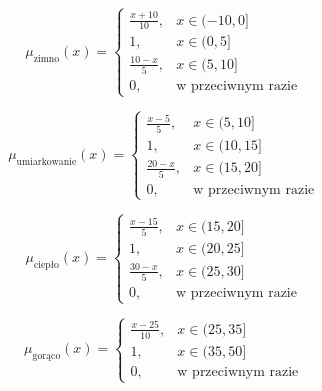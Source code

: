 \documentclass{article}
\begin{document}
\begin{enumerate}
                \begin{equation}
                   \mu_{\text{zimno}}(x) =
                    \begin{cases}
                    \frac{x + 10}{10}, & x \in (-10, 0] \\
                    1, & x \in (0, 5] \\
                    \frac{10 - x}{5}, & x \in (5, 10] \\
                    0, & \text{w przeciwnym razie}
                    \end{cases}
                \end{equation}

                \begin{equation}
                    \mu_{\text{umiarkowanie}}(x) =
                    \begin{cases}
                    \frac{x - 5}{5}, & x \in (5, 10] \\
                    1, & x \in (10, 15] \\
                    \frac{20 - x}{5}, & x \in (15, 20] \\
                    0, & \text{w przeciwnym razie}
                    \end{cases}
                \end{equation}

                \begin{equation}
                    \mu_{\text{ciepło}}(x) =
                    \begin{cases}
                    \frac{x - 15}{5}, & x \in (15, 20] \\
                    1, & x \in (20, 25] \\
                    \frac{30 - x}{5}, & x \in (25, 30] \\
                    0, & \text{w przeciwnym razie}
                    \end{cases}
                \end{equation}

                \begin{equation}
                    \mu_{\text{gorąco}}(x) =
                    \begin{cases}
                    \frac{x - 25}{10}, & x \in (25, 35] \\
                    1, & x \in (35, 50] \\
                    0, & \text{w przeciwnym razie}
                    \end{cases}
                \end{equation}


\end{enumerate}
\end{document}
